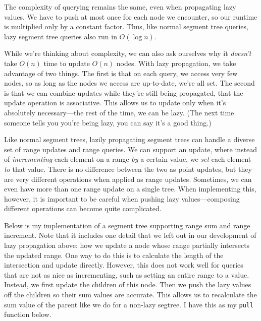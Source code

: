 The complexity of querying remains the same, even when propagating lazy values. We have to push at most once for each node we encounter, so our runtime is multiplied only by a constant factor. Thus, like normal segment tree queries, lazy segment tree queries also run in $O(\log n)$.

While we're thinking about complexity, we can also ask ourselves why it \emph{doesn't} take $O(n)$ time to update $O(n)$ nodes. With lazy propagation, we take advantage of two things. The first is that on each query, we access very few nodes, so as long as the nodes we access are up-to-date, we're all set. The second is that we can combine updates while they're still being propagated, that the update operation is associative. This allows us to update only when it's absolutely necessary---the rest of the time, we can be lazy. (The next time someone tells you you're being lazy, you can say it's a good thing.)

Like normal segment trees, lazily propagating segment trees can handle a diverse set of range updates and range queries. We can support an update, where instead of \textit{incrementing} each element on a range \textit{by} a certain value, we \textit{set} each element \textit{to} that value. There is no difference between the two as point updates, but they are very different operations when applied as range updates. Sometimes, we can even have more than one range update on a single tree. When implementing this, however, it is important to be careful when pushing lazy values---composing different operations can become quite complicated.

Below is my implementation of a segment tree supporting range sum and range increment. Note that it includes one detail that we left out in our development of lazy propagation above: how we update a node whose range partially intersects the updated range. One way to do this is to calculate the length of the intersection and update directly. However, this does not work well for queries that are not as nice as incrementing, such as setting an entire range to a value. Instead, we first update the children of this node. Then we push the lazy values off the children so their sum values are accurate. This allows us to recalculate the sum value of the parent like we do for a non-lazy segtree. I have this as my \texttt{pull} function below.

